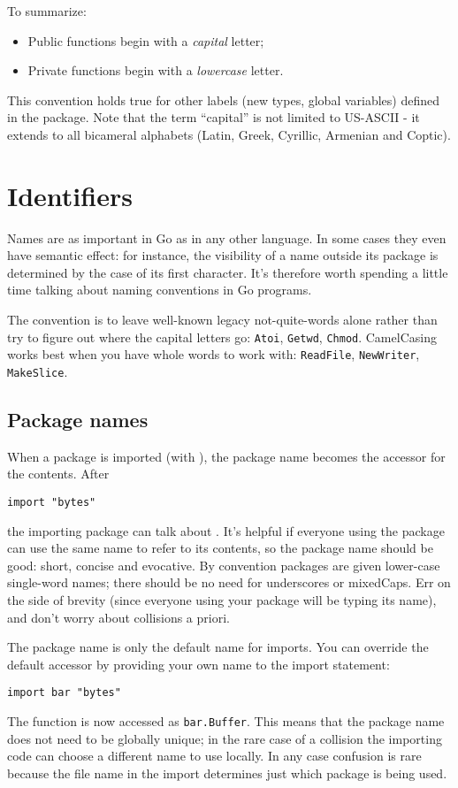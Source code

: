 \noindent{}To summarize:
\begin{itemize}
\item Public functions begin with a \emph{capital} letter;
\item Private functions begin with a \emph{lowercase} letter.
\end{itemize}
This convention holds true for other labels (new types, global
variables) defined in the package. Note that the term ``capital'' is not limited
to US-ASCII - it extends to all bicameral alphabets (Latin, Greek, Cyrillic, Armenian and Coptic).

\section{Identifiers}
Names are as important in Go as in any other language. In some cases
they even have semantic effect: for instance, the visibility of a name
outside its package is determined by the case of its first character.
It's therefore worth spending a little time talking about naming
conventions in Go programs.

The convention is to leave well-known legacy
not-quite-words alone rather than try to figure out where
the capital letters go:  \lstinline{Atoi}, \lstinline{Getwd},
\lstinline{Chmod}.
CamelCasing works best when you have whole words
to work with: \lstinline{ReadFile}, \lstinline{NewWriter}, \lstinline{MakeSlice}.

\subsection{Package names}
When a package is imported (with ), the package name becomes 
the accessor for the contents. After
\begin{lstlisting}
import "bytes"
\end{lstlisting}
the importing package can talk about . It's helpful if
everyone using the package can use the same name to refer to its
contents, so the package name should be good: short,
concise and evocative. By convention packages are given lower-case
single-word names; there should be no need for underscores or mixedCaps.
Err on the side of brevity (since everyone using your package will be
typing its name), and don't worry about collisions a priori.

The package name is only the default name for imports. You can override the default
accessor by providing your own name to the import statement:
\begin{lstlisting}
import bar "bytes"
\end{lstlisting}
The function  is now accessed as \lstinline{bar.Buffer}. This
means that the package name does not need to be globally unique;
in the rare case of a collision the importing
code can choose a different name to use locally. In any case
confusion is rare because the file name in the import determines just
which package is being used.

